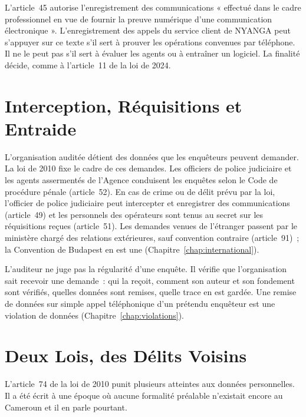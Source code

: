 L'article~45 autorise l'enregistrement des communications « effectué dans le
cadre professionnel en vue de fournir la preuve numérique d'une
communication électronique ». L'enregistrement des appels du service client
de NYANGA peut s'appuyer sur ce texte s'il sert à prouver les opérations
convenues par téléphone. Il ne le peut pas s'il sert à évaluer les agents ou
à entraîner un logiciel. La finalité décide, comme à l'article~11 de la loi
de 2024.

\section{Interception, Réquisitions et Entraide}
\label{sec:c07-enquete}

L'organisation auditée détient des données que les enquêteurs peuvent
demander. La loi de 2010 fixe le cadre de ces demandes. Les officiers de
police judiciaire et les agents assermentés de l'Agence conduisent les
enquêtes selon le Code de procédure pénale (article~52). En cas de crime ou
de délit prévu par la loi, l'officier de police judiciaire peut intercepter
et enregistrer des communications (article~49) et les personnels des
opérateurs sont tenus au secret sur les réquisitions reçues (article~51).
Les demandes venues de l'étranger passent par le ministère chargé des
relations extérieures, sauf convention contraire (article~91)~; la
Convention de Budapest en est une (Chapitre~\ref{chap:international}).

L'auditeur ne juge pas la régularité d'une enquête. Il vérifie que
l'organisation sait recevoir une demande~: qui la reçoit, comment son auteur
et son fondement sont vérifiés, quelles données sont remises, quelle trace
en est gardée. Une remise de données sur simple appel téléphonique d'un
prétendu enquêteur est une violation de données
(Chapitre~\ref{chap:violations}).

\section{Deux Lois, des Délits Voisins}
\label{sec:c07-delits}

L'article~74 de la loi de 2010 punit plusieurs atteintes aux données
personnelles. Il a été écrit à une époque où aucune formalité préalable
n'existait encore au Cameroun et il en parle pourtant.

